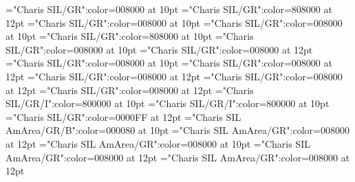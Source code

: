 \documentclass[a4paper,twoside]{article}
\begin{document}
\font\spandefinitionorglossmainentrysubsensesensesensecontentmainentrysubsensessensessensesensecontentsensesentryletDatadicBody="Charis SIL/GR":color=008000 at 10pt
\font\restrictionsmainentrysubsensesensesensecontentmainentrysubsensessensessensesensecontentsensesentryletDatadicBody="Charis SIL/GR":color=808000 at 12pt
\font\spanesrestrictionsmainentrysubsensesensesensecontentmainentrysubsensessensessensesensecontentsensesentryletDatadicBody="Charis SIL/GR":color=008000 at 10pt
\font\spanspanesrestrictionsmainentrysubsensesensesensecontentmainentrysubsensessensessensesensecontentsensesentryletDatadicBody="Charis SIL/GR":color=008000 at 10pt
\font\spanrestrictionsmainentrysubsensesensesensecontentmainentrysubsensessensessensesensecontentsensesentryletDatadicBody="Charis SIL/GR":color=808000 at 10pt
\font\spansensecontentmainentrysubsensessensessensesensecontentsensesentryletDatadicBody="Charis SIL/GR":color=008000 at 10pt
\font\variantformentrybackrefsentryletDatadicBody="Charis SIL/GR":color=008000 at 12pt
\font\spanvariantformentrybackrefsentryletDatadicBody="Charis SIL/GR":color=008000 at 10pt
\font\variantformentrybackrefvariantformentrybackrefsentryletDatadicBody="Charis SIL/GR":color=008000 at 12pt
\font\variantentrytypesvariantformentrybackrefvariantformentrybackrefsentryletDatadicBody="Charis SIL/GR":color=008000 at 12pt
\font\variantentrytypevariantentrytypesvariantformentrybackrefvariantformentrybackrefsentryletDatadicBody="Charis SIL/GR":color=008000 at 12pt
\font\abbreviationvariantentrytypevariantentrytypesvariantformentrybackrefvariantformentrybackrefsentryletDatadicBody="Charis SIL/GR":color=008000 at 12pt
\font\spanesabbreviationvariantentrytypevariantentrytypesvariantformentrybackrefvariantformentrybackrefsentryletDatadicBody="Charis SIL/GR/I":color=800000 at 10pt
\font\spanabbreviationvariantentrytypevariantentrytypesvariantformentrybackrefvariantformentrybackrefsentryletDatadicBody="Charis SIL/GR/I":color=800000 at 10pt
\font\headwordvariantformentrybackrefvariantformentrybackrefsentryletDatadicBody="Charis SIL/GR":color=0000FF at 12pt
\font\spanmxbheadwordvariantformentrybackrefvariantformentrybackrefsentryletDatadicBody="Charis SIL AmArea/GR/B":color=000080 at 10pt
\font\variantformentrybackrefsbentryletDatadicBody="Charis SIL AmArea/GR":color=008000 at 12pt
\font\spanvariantformentrybackrefsbentryletDatadicBody="Charis SIL AmArea/GR":color=008000 at 10pt
\font\variantformentrybackrefbvariantformentrybackrefsbentryletDatadicBody="Charis SIL AmArea/GR":color=008000 at 12pt
\font\variantentrytypesvariantformentrybackrefbvariantformentrybackrefsbentryletDatadicBody="Charis SIL AmArea/GR":color=008000 at 12pt
\end{document}
